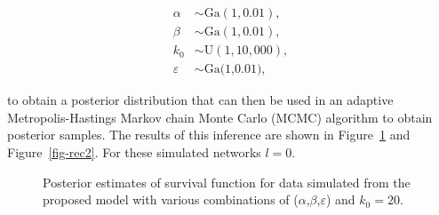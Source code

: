 \documentclass[
  sn-basic,
]{sn-jnl}
\theoremstyle{plain}
\theoremstyle{remark}
\begin{document}
\begin{align*}
\alpha&\sim \text{Ga}(1,0.01),\\
\beta &\sim  \text{Ga}(1,0.01),\\
k_0 &\sim \text{U}(1,10,000),\\
\varepsilon &\sim \text{Ga(1,0.01)},
\end{align*}

to obtain a posterior distribution that can then be used in an adaptive
Metropolis-Hastings Markov chain Monte Carlo (MCMC) algorithm to obtain
posterior samples. The results of this inference are shown in
Figure~\ref{fig-rec1} and Figure~\ref{fig-rec2}. For these simulated
networks \(l=0\).

\begin{figure}[H]


\caption{\label{fig-rec1}Posterior estimates of survival function for
data simulated from the proposed model with various combinations of
(\(\alpha\),\(\beta\),\(\varepsilon\)) and \(k_0=20\).}

\end{figure}%
\end{document}
